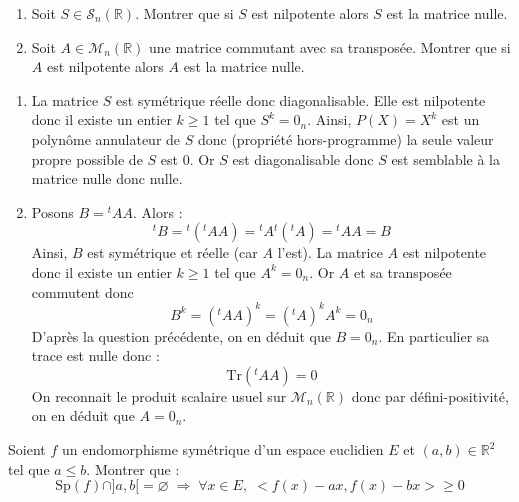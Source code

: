 \documentclass[a4paper,10pt]{report}
\begin{document}
\begin{Exa}
\begin{enumerate}
\item Soit $S \in \mathcal{S}_n(\mathbb{R})$. Montrer que si $S$ est nilpotente alors $S$ est la matrice nulle.
\item Soit $A \in \mathcal{M}_n(\mathbb{R})$ une matrice commutant avec sa transposée. Montrer que si $A$ est nilpotente alors $A$ est la matrice nulle. 
\end{enumerate}
\end{Exa}

\corr

\begin{enumerate}
\item La matrice $S$ est symétrique réelle donc diagonalisable. Elle est nilpotente donc il existe un entier $k \geq 1$ tel que $S^k=0_n$. Ainsi, $P(X)=X^k$ est un polynôme annulateur de $S$ donc (propriété hors-programme) la seule valeur propre possible de $S$ est $0$. Or $S$ est diagonalisable donc $S$ est semblable à la matrice nulle donc nulle.
\item Posons $B= {}^t A A$. Alors :
$$ {}^t B = {}^t ({}^t A A) = {}^t A {}^t({}^tA) = {}^tA A = B$$
Ainsi, $B$ est symétrique et réelle (car $A$ l'est). La matrice $A$ est nilpotente donc il existe un entier $k \geq 1$ tel que $A^k=0_n$. Or $A$ et sa transposée commutent donc 
$$ B^k = ({}^t A A)^k = ({}^t A)^k A^k = 0_n$$
D'après la question précédente, on en déduit que $B=0_n$. En particulier sa trace est nulle donc :
$$ \textrm{Tr}({}^t A A) = 0$$
On reconnait le produit scalaire usuel sur $\mathcal{M}_n(\mathbb{R})$ donc par défini-positivité, on en déduit que $A=0_n$.
\end{enumerate}

\begin{Exa} Soient $f$ un endomorphisme symétrique d'un espace euclidien $E$ et $(a,b) \in \mathbb{R}^2$ tel que $a \leq b$. Montrer que :
$$ \textrm{Sp}(f) \cap ]a,b[ = \varnothing \; \Longrightarrow \; \forall x \in E, \; <f(x)-ax,f(x)-bx> \geq 0$$
\end{Exa}
\end{document}

